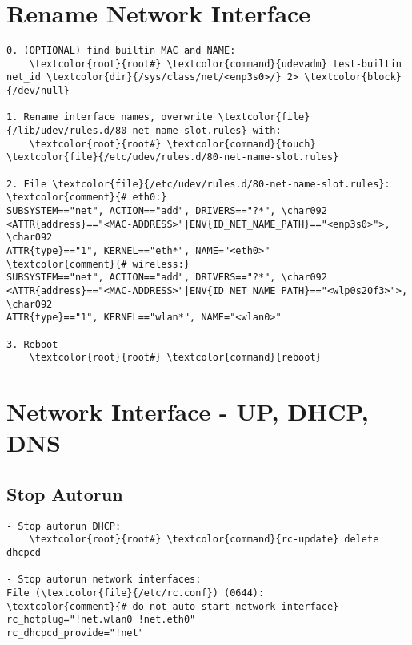 \documentclass[10pt, a4paper, onecolumn, openany]{book}         %
\begin{document}
\section{Rename Network Interface}
\begin{Verbatim}[commandchars=\\\{\}]
0. (OPTIONAL) find builtin MAC and NAME:
    \textcolor{root}{root#} \textcolor{command}{udevadm} test-builtin net_id \textcolor{dir}{/sys/class/net/<enp3s0>/} 2> \textcolor{block}{/dev/null}

1. Rename interface names, overwrite \textcolor{file}{/lib/udev/rules.d/80-net-name-slot.rules} with:
    \textcolor{root}{root#} \textcolor{command}{touch} \textcolor{file}{/etc/udev/rules.d/80-net-name-slot.rules}
    
2. File \textcolor{file}{/etc/udev/rules.d/80-net-name-slot.rules}:
\textcolor{comment}{# eth0:}
SUBSYSTEM=="net", ACTION=="add", DRIVERS=="?*", \char092
<ATTR{address}=="<MAC-ADDRESS>"|ENV{ID_NET_NAME_PATH}=="<enp3s0>">, \char092
ATTR{type}=="1", KERNEL=="eth*", NAME="<eth0>"
\textcolor{comment}{# wireless:}
SUBSYSTEM=="net", ACTION=="add", DRIVERS=="?*", \char092
<ATTR{address}=="<MAC-ADDRESS>"|ENV{ID_NET_NAME_PATH}=="<wlp0s20f3>">, \char092
ATTR{type}=="1", KERNEL=="wlan*", NAME="<wlan0>"

3. Reboot
    \textcolor{root}{root#} \textcolor{command}{reboot}
\end{Verbatim}

\section{Network Interface - UP, DHCP, DNS}
\subsection{Stop Autorun}
\begin{Verbatim}[commandchars=\\\{\}]
- Stop autorun DHCP:
    \textcolor{root}{root#} \textcolor{command}{rc-update} delete dhcpcd

- Stop autorun network interfaces:
File (\textcolor{file}{/etc/rc.conf}) (0644):
\textcolor{comment}{# do not auto start network interface}
rc_hotplug="!net.wlan0 !net.eth0"
rc_dhcpcd_provide="!net"
\end{Verbatim}
\end{document}
